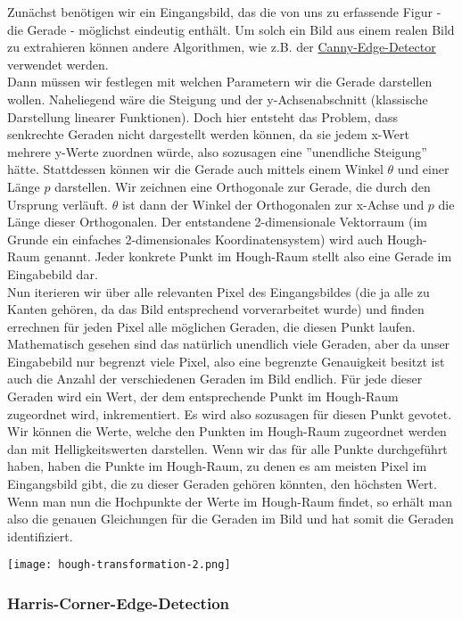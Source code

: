 Zunächst benötigen wir ein Eingangsbild, das die von uns zu erfassende Figur - die Gerade - möglichst eindeutig enthält. Um solch ein Bild aus einem realen Bild zu extrahieren können andere Algorithmen, wie z.B. der \hyperref[sec:canny-edge-detector]{Canny-Edge-Detector} verwendet werden.\\
Dann müssen wir festlegen mit welchen Parametern wir die Gerade darstellen wollen. Naheliegend wäre die Steigung und der y-Achsenabschnitt (klassische Darstellung linearer Funktionen). Doch hier entsteht das Problem, dass senkrechte Geraden nicht dargestellt werden können, da sie jedem x-Wert mehrere y-Werte zuordnen würde, also sozusagen eine ''unendliche Steigung'' hätte. Stattdessen können wir die Gerade auch mittels einem Winkel $\theta$ und einer Länge $p$ darstellen. Wir zeichnen eine Orthogonale zur Gerade, die durch den Ursprung verläuft. $\theta$ ist dann der Winkel der Orthogonalen zur x-Achse und $p$ die Länge dieser Orthogonalen. Der entstandene 2-dimensionale Vektorraum (im Grunde ein einfaches 2-dimensionales Koordinatensystem) wird auch Hough-Raum genannt. Jeder konkrete Punkt im Hough-Raum stellt also eine Gerade im Eingabebild dar.\\
Nun iterieren wir über alle relevanten Pixel des Eingangsbildes (die ja alle zu Kanten gehören, da das Bild entsprechend vorverarbeitet wurde) und finden errechnen für jeden Pixel alle möglichen Geraden, die diesen Punkt laufen. Mathematisch gesehen sind das natürlich unendlich viele Geraden, aber da unser Eingabebild nur begrenzt viele Pixel, also eine begrenzte Genauigkeit besitzt ist auch die Anzahl der verschiedenen Geraden im Bild endlich. Für jede dieser Geraden wird ein Wert, der dem entsprechende Punkt im Hough-Raum zugeordnet wird, inkrementiert. Es wird also sozusagen für diesen Punkt gevotet. Wir können die Werte, welche den Punkten im Hough-Raum zugeordnet werden dan mit Helligkeitswerten darstellen. Wenn wir das für alle Punkte durchgeführt haben, haben die Punkte im Hough-Raum, zu denen es am meisten Pixel im Eingangsbild gibt, die zu dieser Geraden gehören könnten, den höchsten Wert. Wenn man nun die Hochpunkte der Werte im Hough-Raum findet, so erhält man also die genauen Gleichungen für die Geraden im Bild und hat somit die Geraden identifiziert.

\texttt{[image: hough-transformation-2.png]}

\subsubsection{Harris-Corner-Edge-Detection}

